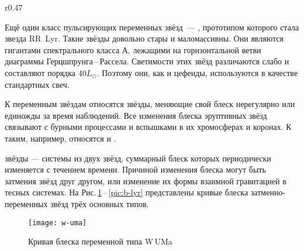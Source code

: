 \begin{wrapfigure}[11]{r}{0.47\tw}
	\centering
	\vspace{-1.2pc}
	\caption{Кривая блеска переменной типа RR~Lyr} %
	\label{pic:light-curve-rr-lyr}
\end{wrapfigure}
Ещё один класс пульсирующих переменных звёзд~--- , прототипом которого стала звезда RR~Lyr. Такие звёзды довольно стары и маломассивны. Они являются гигантами спектрального класса А, лежащими на горизонтальной ветви диаграммы Герцшпрунга\,--\,Рассела. Светимости этих звёзд различаются слабо и составляют порядка $40L_\odot$. Поэтому они, как и цефеиды, используются в качестве стандартных свеч.

К  переменным звёздам относятся звёзды, меняющие свой блеск нерегулярно или единожды за время наблюдений. Все изменения блеска эруптивных звёзд связывают с бурными процессами и вспышками в их хромосферах и коронах. К таким, например, относятся  и .

 звёзды --- системы из двух звёзд, суммарный блеск которых периодически изменяется с течением времени. Причиной изменения блеска могут быть затмения звёзд друг другом, или изменение их формы взаимной гравитацией в тесных системах. На Рис.\,\ref{pic:w-uma}\,--\,\ref{pic:b-lyr}  представлены кривые блеска затменно-переменных звёзд трёх основных типов.

\begin{figure}[!h]
	\centering
	\begin{minipage}[c]{0.49\tw}
	\end{minipage}
	\hfill
	\begin{minipage}[c]{0.49\tw}
		\centering
		\texttt{[image: w-uma]}
	\end{minipage}
	\caption{Кривая блеска переменной типа W\,UMa}
	\label{pic:w-uma}
\end{figure}

